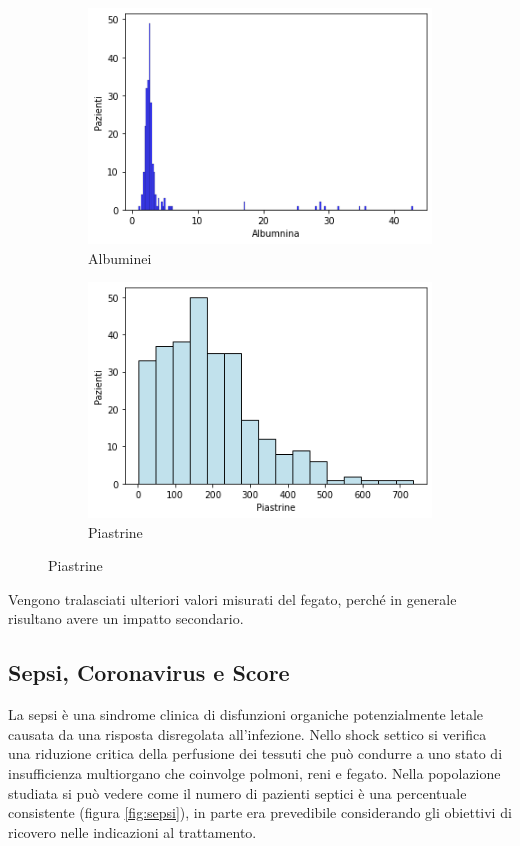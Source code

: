 \begin{figure}[h]
	\begin{subfigure}{.5\textwidth}
		\centering
		\includegraphics[width=.8\linewidth]{capitolo1/alb.png}
		\caption{Albuminei}
		\label{fig:alb}
	\end{subfigure}%
	\begin{subfigure}{.5\textwidth}
		\centering
		\includegraphics[width=.8\linewidth]{capitolo1/piastrine.png}
		\caption{Piastrine}
		\label{fig:piastr}
	\end{subfigure}
\end{figure}

Vengono tralasciati ulteriori valori misurati del fegato, perché in generale risultano avere un impatto secondario.

\subsection{Sepsi, Coronavirus e Score}

La sepsi è una sindrome clinica di disfunzioni organiche potenzialmente letale causata da una risposta disregolata all'infezione. Nello shock settico si verifica una riduzione critica della perfusione dei tessuti che può condurre a uno stato di insufficienza multiorgano che coinvolge polmoni, reni e fegato. Nella popolazione studiata si può vedere come il numero di pazienti septici è una percentuale consistente (figura \ref{fig:sepsi}), in parte era prevedibile considerando gli obiettivi di ricovero nelle indicazioni al trattamento.

